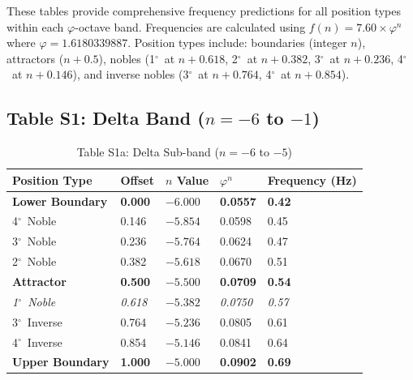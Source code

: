 \documentclass[11pt,a4paper]{article}
\newcommand{\degree}{$^\circ$}  %
\newcommand{\phisym}{\varphi}
\begin{document}
These tables provide comprehensive frequency predictions for all position types within each $\phisym$-octave band. Frequencies are calculated using $f(n) = 7.60 \times \phisym^n$ where $\phisym = 1.6180339887$. Position types include: boundaries (integer $n$), attractors ($n + 0.5$), nobles (1\degree\ at $n + 0.618$, 2\degree\ at $n + 0.382$, 3\degree\ at $n + 0.236$, 4\degree\ at $n + 0.146$), and inverse nobles (3\degree\ at $n + 0.764$, 4\degree\ at $n + 0.854$).

\subsection*{Table S1: Delta Band ($n = -6$ to $-1$)}

\begin{table}[H]
\centering
\caption*{Table S1a: Delta Sub-band ($n = -6$ to $-5$)}
\begin{tabular}{@{}lllll@{}}
\toprule
Position Type & Offset & $n$ Value & $\phisym^n$ & Frequency (Hz) \\
\midrule
\textbf{Lower Boundary} & \textbf{0.000} & $\mathbf{-6.000}$ & \textbf{0.0557} & \textbf{0.42} \\
4\degree\ Noble & 0.146 & $-5.854$ & 0.0598 & 0.45 \\
3\degree\ Noble & 0.236 & $-5.764$ & 0.0624 & 0.47 \\
2\degree\ Noble & 0.382 & $-5.618$ & 0.0670 & 0.51 \\
\textbf{Attractor} & \textbf{0.500} & $\mathbf{-5.500}$ & \textbf{0.0709} & \textbf{0.54} \\
\textit{1\degree\ Noble} & \textit{0.618} & $-5.382$ & \textit{0.0750} & \textit{0.57} \\
3\degree\ Inverse & 0.764 & $-5.236$ & 0.0805 & 0.61 \\
4\degree\ Inverse & 0.854 & $-5.146$ & 0.0841 & 0.64 \\
\textbf{Upper Boundary} & \textbf{1.000} & $\mathbf{-5.000}$ & \textbf{0.0902} & \textbf{0.69} \\
\bottomrule
\end{tabular}
\end{table}
\end{document}
